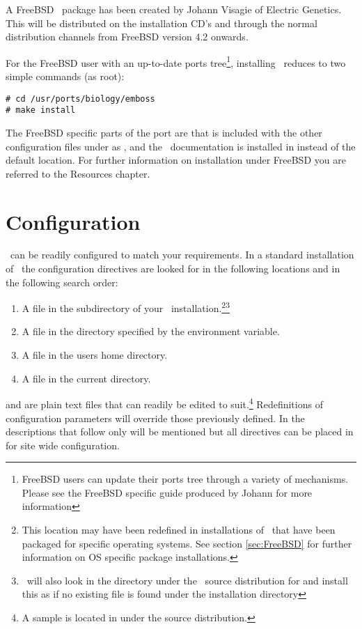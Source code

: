 \documentclass{report}
\begin{document}
A FreeBSD \EMBOSS\ package has been created by Johann
Visagie of Electric Genetics. This will be
distributed on the installation CD's and through the normal
distribution channels from FreeBSD version 4.2 onwards.

For the FreeBSD user with an up-to-date ports tree\footnote{FreeBSD
users can update their ports tree through a variety of
mechanisms. Please see the FreeBSD specific guide produced by Johann
for more information}, installing \EMBOSS\ reduces to two simple
commands (as root):

\begin{verbatim}
# cd /usr/ports/biology/emboss
# make install
\end{verbatim}

The FreeBSD specific parts of the port are that
 is included with the other configuration
files under  as
, and the \EMBOSS\ documentation is
installed in  instead of the
default location.  For further information on installation under
FreeBSD you are referred to the Resources chapter.


\chapter{Configuration}
 
\EMBOSS\ can be readily configured to match your requirements. In a
standard installation of \EMBOSS\ the configuration directives are
looked for in the following locations and in the following search
order:
\begin{enumerate}
\item A file  in the 
subdirectory of your \EMBOSS\ installation.\footnote{This location may
have been redefined in installations of \EMBOSS\ that have been
packaged for specific operating systems. See section \ref{sec:FreeBSD}
for further information on OS specific package
installations.}\footnote{\EMBOSS\ will also look in the
 directory under the \EMBOSS\ source distribution for
 and install this as
 if no existing file is found under the
installation directory}
\item A file  in the directory specified by the
 environment variable.
\item A file  in the users home directory.
\item A file  in the current directory.
\end{enumerate}
 and  are plain text
files that can readily be edited to suit.\footnote{A sample
 is located in  under
the source distribution.} Redefinitions of configuration parameters
will override those previously defined. In the descriptions that
follow only  will be mentioned but all directives
can be placed in  for site wide
configuration.
\end{document}

